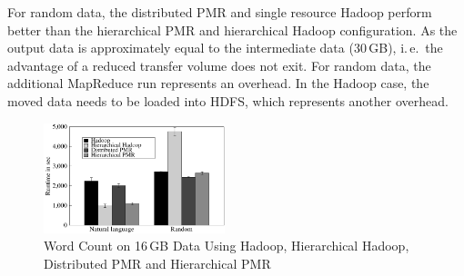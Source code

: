 \documentclass{acm_proc_article-sp}
\newcommand{\upp}{\vspace*{-0.5em}}
\begin{document}

For random data, the distributed PMR and single resource Hadoop
perform better than the hierarchical PMR and hierarchical Hadoop
configuration. As the output data is approximately equal to the
intermediate data (30\,GB), i.\,e.\ the advantage of a reduced
transfer volume does not exit. For random data, the additional
MapReduce run represents an overhead. In the Hadoop case, the moved
data needs to be loaded into HDFS, which represents another overhead.




\begin{figure}[t]
	\upp
	\centering
		\includegraphics[width=0.47\textwidth]{figures/allmrs_rands.pdf}
\caption{Word Count on 16\,GB Data Using Hadoop, Hierarchical Hadoop, Distributed PMR  and Hierarchical PMR} 	
\label{fig:allmrs_rands}
\end{figure}		
\end{document}
